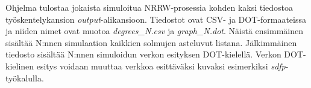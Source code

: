 \documentclass[finnish, 12pt, a4paper, sci, utf8, pdfa]{aaltothesis}
\begin{document}
Ohjelma tulostaa jokaista simuloitua NRRW-prosessia kohden kaksi tiedostoa työskentelykansion \textit{output}-alikansioon. Tiedostot ovat CSV- ja DOT-formaateissa ja niiden nimet ovat muotoa \textit{degrees\_N.csv} ja \textit{graph\_N.dot}. Näistä ensimmäinen sisältää N:nnen simulaation kaikkien solmujen asteluvut listana. Jälkimmäinen tiedosto sisältää N:nnen simuloidun verkon esityksen DOT-kielellä. Verkon DOT-kielinen esitys voidaan muuttaa verkkoa esittäväksi kuvaksi esimerkiksi \textit{sdfp}-työkalulla.

\vspace{0.5cm}


\end{document}

